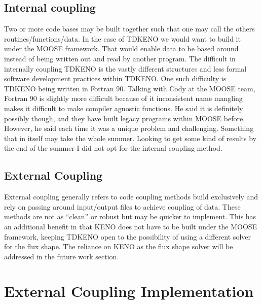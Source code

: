 \documentclass[11pt]{article}
\begin{document}
\subsection{Internal coupling}
 Two or more code bases may be built together such that one may call the others routines/functions/data.  In the case of TDKENO we would want to build it under the MOOSE framework.  That would enable data to be based around instead of being written out and read by another program.  The difficult in internally coupling TDKENO is the vastly different structures and less formal software development practices within TDKENO.  One such difficulty is TDKENO being written in Fortran 90.  Talking with Cody at the MOOSE team, Fortran 90 is slightly more difficult because of it inconsistent name mangling makes it difficult to make compiler agnostic functions.  He said it is definitely possibly though, and they have built legacy programs within MOOSE before.  However, he said each time it was a unique problem and challenging.  Something that in itself may take the whole summer.  Looking to get some kind of results by the end of the summer I did not opt for the internal coupling method.

\subsection{External Coupling}
External coupling generally refers to code coupling methods build exclusively and rely on passing around input/output files to achieve coupling of data.  These methods are not as “clean” or robust but may be quicker to implement. This has an additional benefit in that KENO does not have to be built under the MOOSE framework, keeping TDKENO open to the possibility of using a different solver for the flux shape.  The reliance on KENO as the flux shape solver will be addressed in the future work section. 

\section{External Coupling Implementation}
\end{document}

